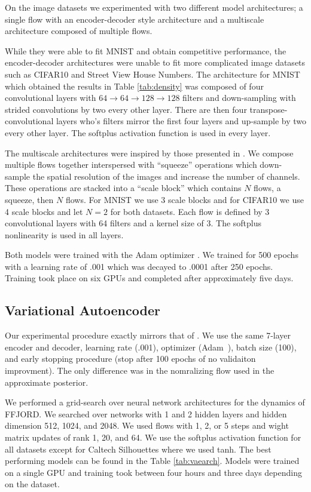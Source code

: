 \documentclass{article} %
\newcommand{\methodname}{FFJORD\xspace}
\newcommand\0{\kern-1.2pt\vec{\kern1.2pt 0}}
\begin{document}
\begin{appendices}
On the image datasets we experimented with two different model architectures; a single flow with an encoder-decoder style architecture and a multiscale architecture composed of multiple flows. 

While they were able to fit MNIST and obtain competitive performance, the encoder-decoder architectures were unable to fit more complicated image datasets such as CIFAR10 and Street View House Numbers. The architecture for MNIST which obtained the results in Table \ref{tab:density} was composed of four convolutional layers with $64 \rightarrow 64 \rightarrow 128 \rightarrow 128$ filters and down-sampling with strided convolutions by two every other layer. There are then four transpose-convolutional layers who's filters mirror the first four layers and up-sample by two every other layer. The softplus activation function is used in every layer. 

The multiscale architectures were inspired by those presented in \cite{dinh2016density}. We compose multiple flows together interspersed with ``squeeze'' operations which down-sample the spatial resolution of the images and increase the number of channels. These operations are stacked into a ``scale block'' which contains $N$ flows, a squeeze, then $N$ flows. For MNIST we use 3 scale blocks and for CIFAR10 we use 4 scale blocks and let $N = 2$ for both datasets. Each flow is defined by 3 convolutional layers with 64 filters and a kernel size of 3. The softplus nonlinearity is used in all layers.

Both models were trained with the Adam optimizer \citep{kingma2014adam}. We trained for 500 epochs with a learning rate of .001 which was decayed to .0001 after 250 epochs. Training took place on six GPUs and completed after approximately five days. 

\subsection{Variational Autoencoder}
\label{sec:vaeexperiment}
Our experimental procedure exactly mirrors that of \cite{berg2018sylvester}.
We use the same 7-layer encoder and decoder, learning rate (.001), optimizer (Adam~\cite{kingma2014adam}), batch size (100), and early stopping procedure (stop after 100 epochs of no validaiton improvment).
The only difference was in the nomralizing flow used in the approximate posterior.

We performed a grid-search over neural network architectures for the dynamics of \methodname.
We searched over networks with 1 and 2 hidden layers and hidden dimension 512, 1024, and 2048.
We used flows with 1, 2, or 5 steps and wight matrix updates of rank 1, 20, and 64.
We use the softplus activation function for all datasets except for Caltech Silhouettes where we used tanh. The best performing models can be found in the Table \ref{tab:vaearch}.
Models were trained on a single GPU and training took between four hours and three days depending on the dataset.   


\end{appendices}
\end{document}
